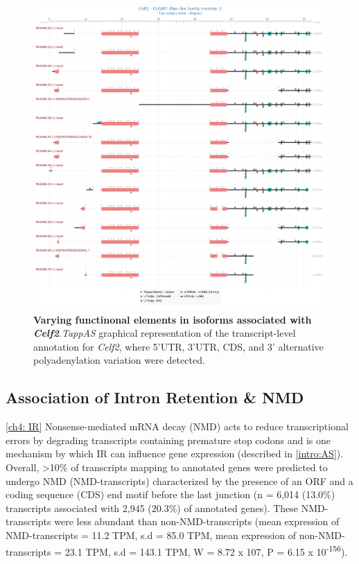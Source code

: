 \begin{figure}[!htp]
	\centering
	\includegraphics[scale = 0.3]{Figures/tappAS_Celf2.png}
	\captionsetup{width=0.95\textwidth}
	\caption[Varying functinonal elements in isoforms associated with \textit{Celf2}]%
	{\textbf{Varying functinonal elements in isoforms associated with \textit{Celf2}}.\textit{TappAS} graphical representation of the transcript-level annotation for \textit{Celf2}, where 5'UTR, 3'UTR, CDS, and 3' alternative polyadenylation variation were detected.}   
	\label{fig:Celf}
\end{figure}	


\subsection{Association of Intron Retention \& NMD}
\cref{ch4: IR}
Nonsense-mediated mRNA decay (NMD) acts to reduce transcriptional errors by degrading transcripts containing premature stop codons\cite{Hug2015} and is one mechanism by which IR can influence gene expression\cite{Pan2006} (described in \cref{intro:AS}). Overall, >10\% of transcripts mapping to annotated genes were predicted to undergo NMD (NMD-transcripts) characterized by the presence of an ORF and a coding sequence (CDS) end motif before the last junction (n = 6,014 (13.0\%) transcripts associated with 2,945 (20.3\%) of annotated genes). These NMD-transcripts were less abundant than non-NMD-transcripts (mean expression of NMD-transcripts = 11.2 TPM, s.d =  85.0 TPM, mean expression of non-NMD-transcripts = 23.1 TPM, s.d = 143.1 TPM, W = 8.72 x 107, P = 6.15 x 10\textsuperscript{-156}).  

